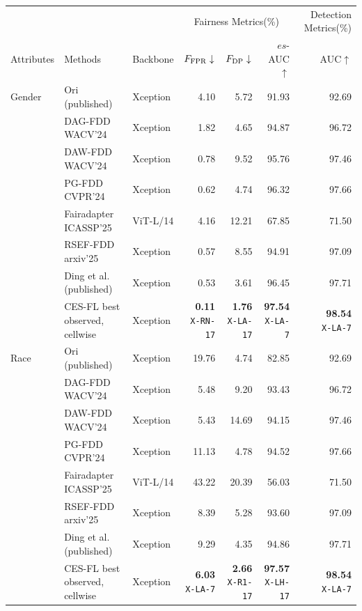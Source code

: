 \documentclass[10pt]{article}
\begin{document}
{\fontsize{9}{10.5}\selectfont\setlength{\tabcolsep}{3pt}
\renewcommand{\arraystretch}{1.05}
\begin{tabular*}{\linewidth}{@{\extracolsep{\fill}}lllrrrr}\toprule
 & & & \multicolumn{3}{c}{Fairness Metrics(\%)} & Detection Metrics(\%)\\
Attributes & Methods & Backbone & $F_{\rm FPR}\downarrow$ & $F_{\rm DP}\downarrow$ & $es$-AUC$\uparrow$ & AUC$\uparrow$\\\midrule
Gender & Ori (published) & Xception & 4.10 & 5.72 & 91.93 & 92.69\\
 & DAG-FDD WACV'24 & Xception & 1.82 & 4.65 & 94.87 & 96.72\\
 & DAW-FDD WACV'24 & Xception & 0.78 & 9.52 & 95.76 & 97.46\\
 & PG-FDD CVPR'24 & Xception & 0.62 & 4.74 & 96.32 & 97.66\\
 & Fairadapter ICASSP'25 & ViT-L/14 & 4.16 & 12.21 & 67.85 & 71.50\\
 & RSEF-FDD arxiv'25 & Xception & 0.57 & 8.55 & 94.91 & 97.09\\
 & Ding et al. (published) & Xception & 0.53 & 3.61 & 96.45 & 97.71\\
\rowcolor{blue!8} & CES-FL best observed, cellwise & Xception & \shortstack{\textbf{0.11}\\{\tiny\texttt{X-RN-17}}} & \shortstack{\textbf{1.76}\\{\tiny\texttt{X-LA-17}}} & \shortstack{\textbf{97.54}\\{\tiny\texttt{X-LA-7}}} & \shortstack{\textbf{98.54}\\{\tiny\texttt{X-LA-7}}}\\
\midrule
Race & Ori (published) & Xception & 19.76 & 4.74 & 82.85 & 92.69\\
 & DAG-FDD WACV'24 & Xception & 5.48 & 9.20 & 93.43 & 96.72\\
 & DAW-FDD WACV'24 & Xception & 5.43 & 14.69 & 94.15 & 97.46\\
 & PG-FDD CVPR'24 & Xception & 11.13 & 4.78 & 94.52 & 97.66\\
 & Fairadapter ICASSP'25 & ViT-L/14 & 43.22 & 20.39 & 56.03 & 71.50\\
 & RSEF-FDD arxiv'25 & Xception & 8.39 & 5.28 & 93.60 & 97.09\\
 & Ding et al. (published) & Xception & 9.29 & 4.35 & 94.86 & 97.71\\
\rowcolor{blue!8} & CES-FL best observed, cellwise & Xception & \shortstack{\textbf{6.03}\\{\tiny\texttt{X-LA-7}}} & \shortstack{\textbf{2.66}\\{\tiny\texttt{X-R1-17}}} & \shortstack{\textbf{97.57}\\{\tiny\texttt{X-LH-17}}} & \shortstack{\textbf{98.54}\\{\tiny\texttt{X-LA-7}}}\\

\end{tabular*}}
\end{document}
